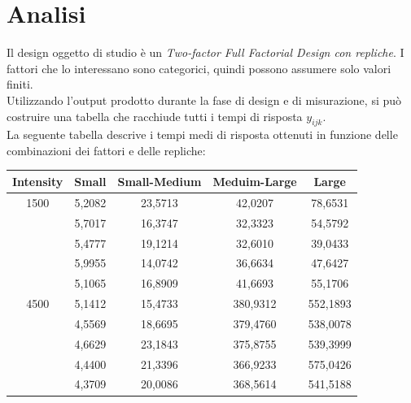 \section{Analisi}
Il design oggetto di studio è un \textit{Two-factor Full Factorial Design con repliche}.
I fattori che lo interessano sono categorici, quindi possono assumere solo valori finiti. 
\\Utilizzando l'output prodotto durante la fase di design e di misurazione, si può costruire una tabella che racchiude tutti i tempi di risposta $y_{ijk}$.
\\La seguente tabella descrive i tempi medi di risposta ottenuti in funzione delle combinazioni dei fattori e delle repliche:
\begin{table}[H]
	\begin{center}
		\begin{tabular}{|c|c|c|c|c|}
			\hline
			Intensity & Small & Small-Medium & Meduim-Large & Large\\
			\hline
			\rule[-4mm]{0mm}{0.5cm}
			1500 & 5,2082 & 23,5713 & 42,0207 & 78,6531\\
			\rule[-4mm]{0mm}{0.5cm}
			& 5,7017 & 16,3747 & 32,3323 & 54,5792\\
			\rule[-4mm]{0mm}{0.5cm}
			& 5,4777 & 19,1214 & 32,6010 & 39,0433\\
			\rule[-4mm]{0mm}{0.5cm}
			& 5,9955 & 14,0742 & 36,6634 & 47,6427\\	
			\rule[-4mm]{0mm}{0.5cm}
			& 5,1065 & 16,8909 & 41,6693 & 55,1706\\ 
			\hline
			\rule[-0.5cm]{0mm}{0.5cm}
			4500 & 5,1412 & 15,4733 & 380,9312 & 552,1893\\
			\rule[-0.5cm]{0mm}{0.5cm}
			& 4,5569 & 18,6695 & 379,4760 & 538,0078\\
			\rule[-0.5cm]{0mm}{0.5cm}
			& 4,6629 & 23,1843 & 375,8755 & 539,3999\\
			\rule[-0.5cm]{0mm}{0.5cm}
			& 4,4400 & 21,3396 & 366,9233 & 575,0426\\	
			\rule[-0.5cm]{0mm}{0.5cm}
			& 4,3709 & 20,0086 & 368,5614 & 541,5188\\
			\hline
		\end{tabular}
	\end{center}
\label{experimental_data}
\end{table}
